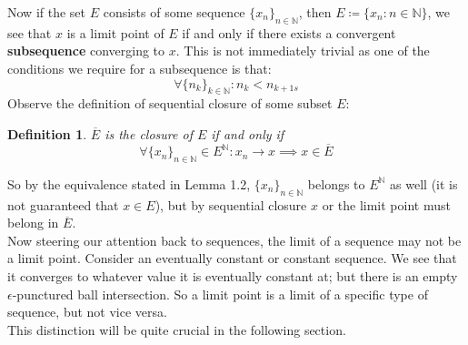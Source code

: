 \documentclass[10pt,letterpaper]{article} %
\newtheorem{defn}{Definition}[section]
\begin{document}
Now if the set $E$ consists of some sequence $\{x_n\}_{n \in \mathbb{N}}$, then $E \coloneq \{x_n : n \in \mathbb{N}\}$, we see that $x$ is a limit point of $E$ if and only if there exists a convergent \textbf{subsequence} converging to $x$. This is not immediately trivial as one of the conditions we require for a subsequence is that:
\begin{equation*}
\forall \{n_k\}_{k \in \mathbb{N}}: n_k < n_{k+1s}
\end{equation*}
Observe the definition of sequential closure of some subset $E$:
\begin{defn}
$\overline{E}$ is the closure of $E$ if and only if
\begin{equation*}
\forall \{x_n\}_{n \in \mathbb{N}} \in E^\mathbb{N}: x_n \xrightarrow{} x \implies x \in \overline{E}
\end{equation*}
\end{defn}
So by the equivalence stated in Lemma 1.2, $\{x_n\}_{n \in \mathbb{N}}$ belongs to $E^\mathbb{N}$ as well (it is not guaranteed that $x \in E$), but by sequential closure $x$ or the limit point must belong in $\overline{E}$.\\

Now steering our attention back to sequences, the limit of a sequence may not be a limit point. Consider an eventually constant or constant sequence. We see that it converges to whatever value it is eventually constant at; but there is an empty $\epsilon$-punctured ball intersection. So a limit point is a limit of a specific type of sequence, but not vice versa.\\

This distinction will be quite crucial in the following section.
\end{document}
